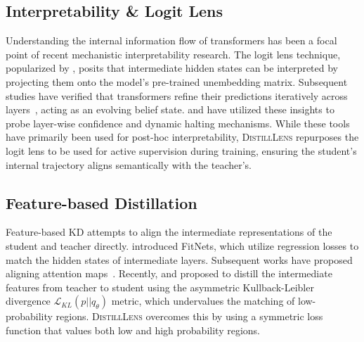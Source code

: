 \documentclass{article}
\theoremstyle{plain}
\theoremstyle{definition}
\theoremstyle{remark}
\begin{document}


\subsection{Interpretability \& Logit Lens}
Understanding the internal information flow of transformers has been a focal point of recent mechanistic interpretability research. The logit lens technique, popularized by \citet{nostalgebraist2020interpreting}, posits that intermediate hidden states can be interpreted by projecting them onto the model's pre-trained unembedding matrix. 
Subsequent studies have verified that transformers refine their predictions iteratively across layers~\cite{geva2021transformer,elhage2021mathematical}, acting as an evolving belief state. \citet{belrose2023eliciting} and \citet{halawi2024overthinking} have utilized these insights to probe layer-wise confidence and dynamic halting mechanisms.
While these tools have primarily been used for post-hoc interpretability, \textsc{DistillLens} repurposes the logit lens to be used for active supervision during training, ensuring the student's internal trajectory aligns semantically with the teacher's.

\subsection{Feature-based Distillation}
Feature-based KD attempts to align the intermediate representations of the student and teacher directly. 
\citet{romero2014fitnets} introduced FitNets, which utilize regression losses to match the hidden states of intermediate layers. Subsequent works have proposed aligning attention maps~\cite{zagoruyko2017paying,wang2020minilm}.
Recently, \citet{sun2019patient} and \citet{gong2025beyond} proposed to distill the intermediate features from teacher to student using the asymmetric Kullback-Leibler divergence $\mathcal{L}_{KL}(p||q_\theta)$ metric, which undervalues the matching of low-probability regions.
\textsc{DistillLens} overcomes this by using a symmetric loss function that values both low and high probability regions.
\end{document}
